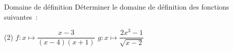 \documentclass{beamer}
\begin{document}
\begin{frame}{Domaine de définition}
	Déterminer le domaine de définition des fonctions suivantes~:

	\begin{tasks}(2)
		\task $f:x\mapsto \dfrac{x-3}{(x-4)(x+1)}$
		\task $g:x\mapsto \dfrac{2x^3-1}{\sqrt{x-2}}$
	\end{tasks}
\end{frame}
\end{document}
